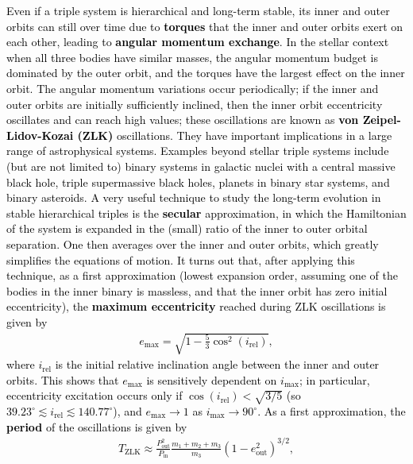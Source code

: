 \documentclass[main.tex]{subfiles}
\begin{document}
\begin{tcolorbox}[sharp corners, colback=blue!30, colframe=blue!80!blue, title=Orbital dynamics V$^9$]
\par \textcolor{black}{Even if a triple system is hierarchical and long-term stable, its inner and outer orbits can still over time due to {\bf torques} that the inner and outer orbits exert on each other, leading to {\bf angular momentum exchange}. In the stellar context when all three bodies have similar masses, the angular momentum budget is dominated by the outer orbit, and the torques have the largest effect on the inner orbit. The angular momentum variations occur periodically; if the inner and outer orbits are initially sufficiently inclined, then the inner orbit eccentricity oscillates and can reach high values; these oscillations are known as  {\bf von Zeipel-Lidov-Kozai (ZLK)} oscillations. They have important implications in a large range of astrophysical systems. Examples beyond stellar triple systems include (but are not limited to) binary systems in galactic nuclei with a central massive black hole, triple supermassive black holes, planets in binary star systems, and binary asteroids.
A very useful technique to study the long-term evolution in stable hierarchical triples is the {\bf secular} approximation, in which the Hamiltonian of the system is expanded in the (small) ratio of the inner to outer orbital separation. One then averages over the inner and outer orbits, which greatly simplifies the equations of motion. It turns out that, after applying this technique, as a first approximation (lowest expansion order, assuming one of the bodies in the inner binary is massless, and that the inner orbit has zero initial eccentricity), the {\bf maximum eccentricity} reached during ZLK oscillations is given by
\begin{align}
\label{eq:ZLK_emax}
e_\mathrm{max} = \sqrt{1-\frac{5}{3}\cos^2 (i_\mathrm{rel})},
\end{align}
where $i_\mathrm{rel}$ is the initial relative inclination angle between the inner and outer orbits. This shows that $e_\mathrm{max}$ is sensitively dependent on $i_\mathrm{max}$; in particular,  eccentricity excitation occurs only if $\cos(i_\mathrm{rel}) < \sqrt{3/5}$ (so $39.23^\circ \lesssim i_\mathrm{rel} \lesssim 140.77^\circ$), and $e_\mathrm{max} \rightarrow 1$ as $i_\mathrm{max} \rightarrow 90^\circ$. As a first approximation, the {\bf period} of the oscillations is given by
\begin{align}
T_\mathrm{ZLK} \approx \frac{P_\mathrm{out}^2}{P_\mathrm{in}} \frac{m_1+m_2+m_3}{m_3} \left(1-e_\mathrm{out}^2 \right )^{3/2},

\end{align}}
\end{tcolorbox}
\end{document}
